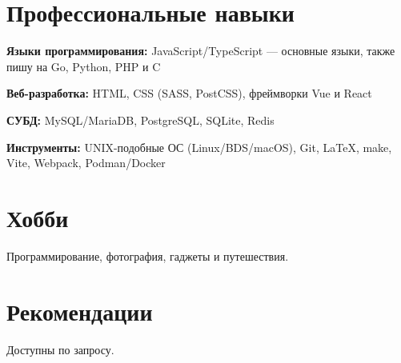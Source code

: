 \documentclass[10pt]{article}
\begin{document}

\section{Профессиональные навыки}

\begin{compactitemize}
	\item \textbf{Языки программирования:} JavaScript/TypeScript --- основные языки, также пишу на Go, Python, PHP и C
	\item \textbf{Веб-разработка:} HTML, CSS (SASS, PostCSS), фреймворки Vue и React
	\item \textbf{СУБД:} MySQL/MariaDB, PostgreSQL, SQLite, Redis
	\item \textbf{Инструменты:} UNIX-подобные ОС (Linux/BDS/macOS), Git, \LaTeX, make, Vite, Webpack, Podman/Docker
\end{compactitemize}


\section{Хобби}

Программирование, фотография, гаджеты и путешествия.


\section{Рекомендации}

Доступны по запросу.


\end{document}
